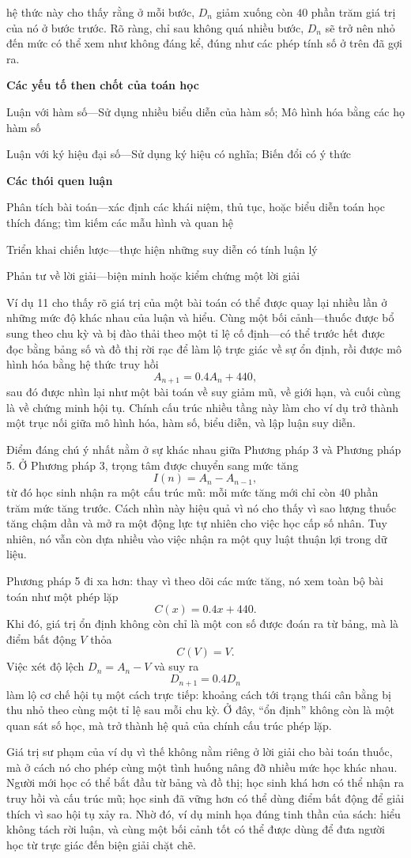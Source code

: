 \documentclass[
  10pt,
  a4paper,
  landscape,
  twoside,
  openany
]{scrbook}
\begin{document}
{\begin{description}
  hệ thức này cho thấy rằng ở mỗi bước, $D_n$ giảm xuống còn $40$ phần trăm giá trị của nó ở bước trước. Rõ ràng, chỉ sau không quá nhiều bước, $D_n$ sẽ trở nên nhỏ đến mức có thể xem như không đáng kể, đúng như các phép tính số ở trên đã gợi ra.
\end{description}

\noindent
\textbf{Các yếu tố then chốt của toán học}

Luận với hàm số---Sử dụng nhiều biểu diễn của hàm số; Mô hình hóa bằng các họ hàm số

Luận với ký hiệu đại số---Sử dụng ký hiệu có nghĩa; Biến đổi có ý thức

\noindent
\textbf{Các thói quen luận}

Phân tích bài toán---xác định các khái niệm, thủ tục, hoặc biểu diễn toán học thích đáng; tìm kiếm các mẫu hình và quan hệ  

Triển khai chiến lược---thực hiện những suy diễn có tính luận lý  

Phản tư về lời giải---biện minh hoặc kiểm chứng một lời giải
}
{
Ví dụ 11 cho thấy rõ giá trị của một bài toán có thể được quay lại nhiều lần ở những mức độ khác nhau của luận và hiểu. Cùng một bối cảnh---thuốc được bổ sung theo chu kỳ và bị đào thải theo một tỉ lệ cố định---có thể trước hết được đọc bằng bảng số và đồ thị rời rạc để làm lộ trực giác về sự ổn định, rồi được mô hình hóa bằng hệ thức truy hồi
$$
A_{n+1}=0.4A_n+440,
$$
sau đó được nhìn lại như một bài toán về suy giảm mũ, về giới hạn, và cuối cùng là về chứng minh hội tụ. Chính cấu trúc nhiều tầng này làm cho ví dụ trở thành một trục nối giữa mô hình hóa, hàm số, biểu diễn, và lập luận suy diễn. 

Điểm đáng chú ý nhất nằm ở sự khác nhau giữa Phương pháp 3 và Phương pháp 5. Ở Phương pháp 3, trọng tâm được chuyển sang mức tăng
$$
I(n)=A_n-A_{n-1},
$$
từ đó học sinh nhận ra một cấu trúc mũ: mỗi mức tăng mới chỉ còn $40$ phần trăm mức tăng trước. Cách nhìn này hiệu quả vì nó cho thấy vì sao lượng thuốc tăng chậm dần và mở ra một động lực tự nhiên cho việc học cấp số nhân. Tuy nhiên, nó vẫn còn dựa nhiều vào việc nhận ra một quy luật thuận lợi trong dữ liệu.

Phương pháp 5 đi xa hơn: thay vì theo dõi các mức tăng, nó xem toàn bộ bài toán như một phép lặp
$$
C(x)=0.4x+440.
$$
Khi đó, giá trị ổn định không còn chỉ là một con số được đoán ra từ bảng, mà là điểm bất động $V$ thỏa
$$
C(V)=V.
$$
Việc xét độ lệch $D_n=A_n-V$ và suy ra
$$
D_{n+1}=0.4D_n
$$
làm lộ cơ chế hội tụ một cách trực tiếp: khoảng cách tới trạng thái cân bằng bị thu nhỏ theo cùng một tỉ lệ sau mỗi chu kỳ. Ở đây, ``ổn định'' không còn là một quan sát số học, mà trở thành hệ quả của chính cấu trúc phép lặp.

Giá trị sư phạm của ví dụ vì thế không nằm riêng ở lời giải cho bài toán thuốc, mà ở cách nó cho phép cùng một tình huống nâng đỡ nhiều mức học khác nhau. Người mới học có thể bắt đầu từ bảng và đồ thị; học sinh khá hơn có thể nhận ra truy hồi và cấu trúc mũ; học sinh đã vững hơn có thể dùng điểm bất động để giải thích vì sao hội tụ xảy ra. Nhờ đó, ví dụ minh họa đúng tinh thần của sách: hiểu không tách rời luận, và cùng một bối cảnh tốt có thể được dùng để đưa người học từ trực giác đến biện giải chặt chẽ. 
}
\end{document}
